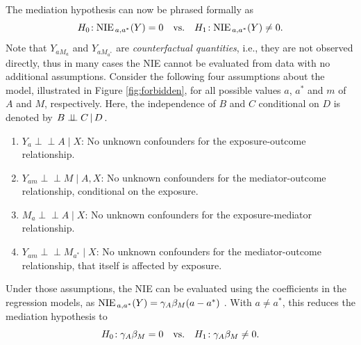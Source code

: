 \documentclass[ejs, twoside]{imsart}
\theoremstyle{plain}
\theoremstyle{remark}
\newcommand{\fullstop}{\text{.}}
\newcommand{\indep}{\perp \!\!\! \perp}
\newcommand{\cond}[2]{\left.{#1}\,\middle|\,{#2}\right.}
\numberwithin{equation}{section}
\numberwithin{table}{section}
\numberwithin{figure}{section}
\let\originalleft\left
\let\originalright\right
\renewcommand{\left}{\mathopen{}\mathclose\bgroup\originalleft}
\renewcommand{\right}{\aftergroup\egroup\originalright}
\begin{document}
The mediation hypothesis can now be phrased formally as
\[\hypothesis{\NIE = 0}{\NIE \neq 0} \fullstop\]
Note that \(Y_{aM_a}\) and \(Y_{aM_{a^*}}\) are \emph{counterfactual quantities}, i.e., they are not observed directly, thus in many cases the NIE cannot be evaluated from data with no additional assumptions. Consider the following four assumptions about the model, illustrated in Figure \ref{fig:forbidden}, for all possible values \(a\), \(a^*\) and \(m\) of \(A\) and \(M\), respectively. Here, the independence of $B$ and $C$ conditional on $D$ is denoted by $\cond{B \indep C}{D}$.
\begin{enumerate}[label = (\roman*)] \label{assumptions}
	\item $Y_a \indep  A \mid X$: No unknown confounders for the exposure-outcome relationship.
	\item $Y_{am} \indep M \mid  A,X  $: No unknown confounders for the mediator-outcome relationship, conditional on the exposure.
	\item $M_a \indep A \mid X$: No unknown confounders for the exposure-mediator relationship.
	\item $Y_{am} \indep M_{a^*} \mid X$: No unknown confounders for the mediator-outcome relationship, that itself is affected by exposure.
\end{enumerate}
 Under those assumptions, the NIE can be evaluated using the coefficients in the regression models, as \(\NIE = \regcoefx{1} \regcoefx{2} \left( a - a^* \right) \) \citep{pearl_direct_2001, vanderweele_three-way_2013, barfield_testing_2017}. With \(a \neq a^*\), this reduces the mediation hypothesis to
 \begin{equation} \label{eq:medhyp}
 	\hypothesis{
 		\regcoefx{1} \regcoefx{2} = 0
 	}{
 		\regcoefx{1} \regcoefx{2} \neq 0
 	} \fullstop
 \end{equation}
\end{document}

